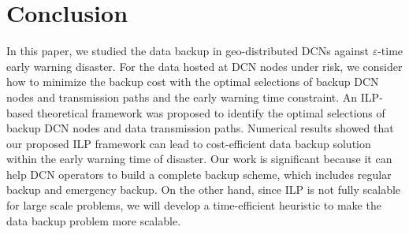 \documentclass[conference]{IEEEtran}\IEEEoverridecommandlockouts
\begin{document}
 \section{Conclusion}\label{conclusion}
In this paper, we studied the data backup in geo-distributed DCNs against $\varepsilon$-time early warning disaster. For the data hosted at DCN nodes under risk, we consider how to minimize the backup cost with the  optimal selections of backup DCN nodes  and transmission paths and the early warning time constraint. An  ILP-based theoretical framework was proposed to identify the optimal selections of backup DCN nodes and data transmission paths. Numerical results showed that our proposed ILP framework can lead to cost-efficient data backup solution within the early warning time of disaster.  Our work is significant because it can  help DCN operators to build a complete backup scheme, which includes regular backup and emergency backup.  On the other hand, since ILP is not fully scalable for large scale problems, we will develop a time-efficient heuristic to make the data backup problem more scalable.















\ifCLASSOPTIONcaptionsoff
  \newpage
\fi


\end{document}
